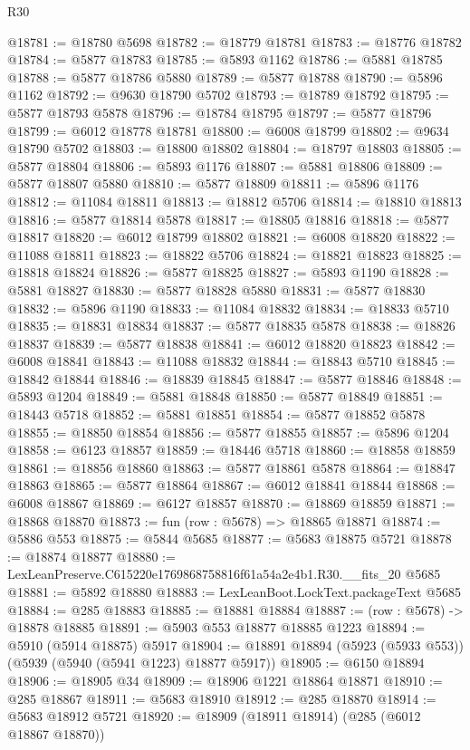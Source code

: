 \begin{lexlean}{R30}
\begin{coremodule}
@18781 := @18780 @5698
@18782 := @18779 @18781
@18783 := @18776 @18782
@18784 := @5877 @18783
@18785 := @5893 @1162
@18786 := @5881 @18785
@18788 := @5877 @18786 @5880
@18789 := @5877 @18788
@18790 := @5896 @1162
@18792 := @9630 @18790 @5702
@18793 := @18789 @18792
@18795 := @5877 @18793 @5878
@18796 := @18784 @18795
@18797 := @5877 @18796
@18799 := @6012 @18778 @18781
@18800 := @6008 @18799
@18802 := @9634 @18790 @5702
@18803 := @18800 @18802
@18804 := @18797 @18803
@18805 := @5877 @18804
@18806 := @5893 @1176
@18807 := @5881 @18806
@18809 := @5877 @18807 @5880
@18810 := @5877 @18809
@18811 := @5896 @1176
@18812 := @11084 @18811
@18813 := @18812 @5706
@18814 := @18810 @18813
@18816 := @5877 @18814 @5878
@18817 := @18805 @18816
@18818 := @5877 @18817
@18820 := @6012 @18799 @18802
@18821 := @6008 @18820
@18822 := @11088 @18811
@18823 := @18822 @5706
@18824 := @18821 @18823
@18825 := @18818 @18824
@18826 := @5877 @18825
@18827 := @5893 @1190
@18828 := @5881 @18827
@18830 := @5877 @18828 @5880
@18831 := @5877 @18830
@18832 := @5896 @1190
@18833 := @11084 @18832
@18834 := @18833 @5710
@18835 := @18831 @18834
@18837 := @5877 @18835 @5878
@18838 := @18826 @18837
@18839 := @5877 @18838
@18841 := @6012 @18820 @18823
@18842 := @6008 @18841
@18843 := @11088 @18832
@18844 := @18843 @5710
@18845 := @18842 @18844
@18846 := @18839 @18845
@18847 := @5877 @18846
@18848 := @5893 @1204
@18849 := @5881 @18848
@18850 := @5877 @18849
@18851 := @18443 @5718
@18852 := @5881 @18851
@18854 := @5877 @18852 @5878
@18855 := @18850 @18854
@18856 := @5877 @18855
@18857 := @5896 @1204
@18858 := @6123 @18857
@18859 := @18446 @5718
@18860 := @18858 @18859
@18861 := @18856 @18860
@18863 := @5877 @18861 @5878
@18864 := @18847 @18863
@18865 := @5877 @18864
@18867 := @6012 @18841 @18844
@18868 := @6008 @18867
@18869 := @6127 @18857
@18870 := @18869 @18859
@18871 := @18868 @18870
@18873 := fun (row : @5678) => @18865 @18871
@18874 := @5886 @553
@18875 := @5844 @5685
@18877 := @5683 @18875 @5721
@18878 := @18874 @18877
@18880 := LexLeanPreserve.C615220e1769868758816f61a54a2e4b1.R30.__fits_20 @5685
@18881 := @5892 @18880
@18883 := LexLeanBoot.LockText.packageText @5685
@18884 := @285 @18883
@18885 := @18881 @18884
@18887 := (row : @5678) -> @18878 @18885
@18891 := @5903 @553 @18877 @18885 @1223
@18894 := @5910 (@5914 @18875) @5917
@18904 := @18891 @18894 (@5923 (@5933 @553)) (@5939 (@5940 (@5941 @1223) @18877 @5917))
@18905 := @6150 @18894
@18906 := @18905 @34
@18909 := @18906 @1221 @18864 @18871
@18910 := @285 @18867
@18911 := @5683 @18910
@18912 := @285 @18870
@18914 := @5683 @18912 @5721
@18920 := @18909 (@18911 @18914) (@285 (@6012 @18867 @18870))

\end{coremodule}
\end{lexlean}
